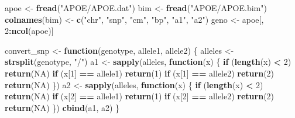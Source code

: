 \documentclass[
]{article}
\newenvironment{Shaded}{\begin{snugshade}}{\end{snugshade}}
\newcommand{\ConstantTok}[1]{\textcolor[rgb]{0.56,0.35,0.01}{#1}}
\newcommand{\ControlFlowTok}[1]{\textcolor[rgb]{0.13,0.29,0.53}{\textbf{#1}}}
\newcommand{\DecValTok}[1]{\textcolor[rgb]{0.00,0.00,0.81}{#1}}
\newcommand{\FunctionTok}[1]{\textcolor[rgb]{0.13,0.29,0.53}{\textbf{#1}}}
\newcommand{\NormalTok}[1]{#1}
\newcommand{\OtherTok}[1]{\textcolor[rgb]{0.56,0.35,0.01}{#1}}
\newcommand{\SpecialCharTok}[1]{\textcolor[rgb]{0.81,0.36,0.00}{\textbf{#1}}}
\newcommand{\StringTok}[1]{\textcolor[rgb]{0.31,0.60,0.02}{#1}}
\begin{document}
\begin{Shaded}
\begin{Highlighting}[]
\NormalTok{apoe }\OtherTok{\textless{}{-}} \FunctionTok{fread}\NormalTok{(}\StringTok{"APOE/APOE.dat"}\NormalTok{)}
\NormalTok{bim }\OtherTok{\textless{}{-}} \FunctionTok{fread}\NormalTok{(}\StringTok{"APOE/APOE.bim"}\NormalTok{)}
\FunctionTok{colnames}\NormalTok{(bim) }\OtherTok{\textless{}{-}} \FunctionTok{c}\NormalTok{(}\StringTok{"chr"}\NormalTok{, }\StringTok{"snp"}\NormalTok{, }\StringTok{"cm"}\NormalTok{, }\StringTok{"bp"}\NormalTok{, }\StringTok{"a1"}\NormalTok{, }\StringTok{"a2"}\NormalTok{)}
\NormalTok{geno }\OtherTok{\textless{}{-}}\NormalTok{ apoe[, }\DecValTok{2}\SpecialCharTok{:}\FunctionTok{ncol}\NormalTok{(apoe)]}

\NormalTok{convert\_snp }\OtherTok{\textless{}{-}} \ControlFlowTok{function}\NormalTok{(genotype, allele1, allele2) \{}
\NormalTok{  alleles }\OtherTok{\textless{}{-}} \FunctionTok{strsplit}\NormalTok{(genotype, }\StringTok{"/"}\NormalTok{)}
\NormalTok{  a1 }\OtherTok{\textless{}{-}} \FunctionTok{sapply}\NormalTok{(alleles, }\ControlFlowTok{function}\NormalTok{(x) \{}
    \ControlFlowTok{if}\NormalTok{ (}\FunctionTok{length}\NormalTok{(x) }\SpecialCharTok{\textless{}} \DecValTok{2}\NormalTok{) }\FunctionTok{return}\NormalTok{(}\ConstantTok{NA}\NormalTok{)}
    \ControlFlowTok{if}\NormalTok{ (x[}\DecValTok{1}\NormalTok{] }\SpecialCharTok{==}\NormalTok{ allele1) }\FunctionTok{return}\NormalTok{(}\DecValTok{1}\NormalTok{)}
    \ControlFlowTok{if}\NormalTok{ (x[}\DecValTok{1}\NormalTok{] }\SpecialCharTok{==}\NormalTok{ allele2) }\FunctionTok{return}\NormalTok{(}\DecValTok{2}\NormalTok{)}
    \FunctionTok{return}\NormalTok{(}\ConstantTok{NA}\NormalTok{)}
\NormalTok{  \})}
\NormalTok{  a2 }\OtherTok{\textless{}{-}} \FunctionTok{sapply}\NormalTok{(alleles, }\ControlFlowTok{function}\NormalTok{(x) \{}
    \ControlFlowTok{if}\NormalTok{ (}\FunctionTok{length}\NormalTok{(x) }\SpecialCharTok{\textless{}} \DecValTok{2}\NormalTok{) }\FunctionTok{return}\NormalTok{(}\ConstantTok{NA}\NormalTok{)}
    \ControlFlowTok{if}\NormalTok{ (x[}\DecValTok{2}\NormalTok{] }\SpecialCharTok{==}\NormalTok{ allele1) }\FunctionTok{return}\NormalTok{(}\DecValTok{1}\NormalTok{)}
    \ControlFlowTok{if}\NormalTok{ (x[}\DecValTok{2}\NormalTok{] }\SpecialCharTok{==}\NormalTok{ allele2) }\FunctionTok{return}\NormalTok{(}\DecValTok{2}\NormalTok{)}
    \FunctionTok{return}\NormalTok{(}\ConstantTok{NA}\NormalTok{)}
\NormalTok{  \})}
  \FunctionTok{cbind}\NormalTok{(a1, a2)}
\NormalTok{\}}


\end{Highlighting}
\end{Shaded}
\end{document}
